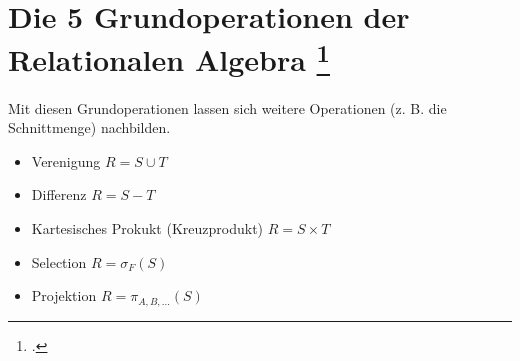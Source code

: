 \documentclass{lehramt-informatik-haupt}
\begin{document}
\section{Die 5 Grundoperationen der Relationalen Algebra
\footcite{net:pdf:lmu:dbs}
}

Mit diesen Grundoperationen lassen sich weitere Operationen (z. B. die
Schnittmenge) nachbilden.

\begin{itemize}
\item Verenigung $R = S \cup T$
\item Differenz $R = S - T$
\item Kartesisches Prokukt (Kreuzprodukt) $R = S \times T$
\item Selection $R = \sigma_F(S)$
\item Projektion $R = \pi_{A,B,...}(S)$
\end{itemize}

\literatur
\end{document}
